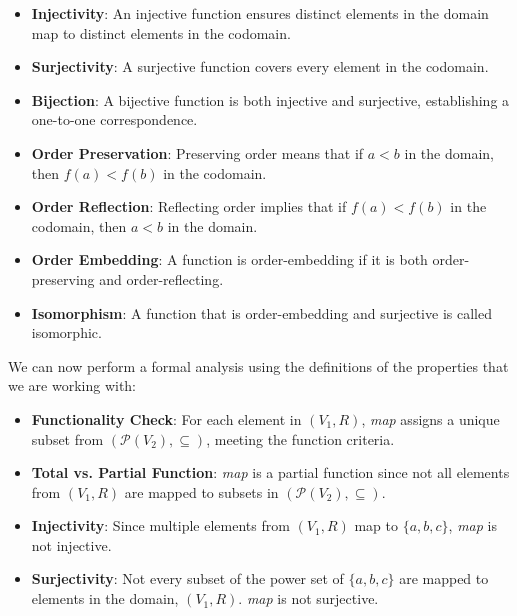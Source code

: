 \documentclass[12pt]{article}
\begin{document}
\begin{spacing}{1.5}
\begin{itemize}
		\item \textbf{Injectivity}: An injective function ensures distinct elements in the domain map to distinct elements in the codomain.
		      		          
		\item \textbf{Surjectivity}: A surjective function covers every element in the codomain.
		      		          
		\item \textbf{Bijection}: A bijective function is both injective and surjective, establishing a one-to-one correspondence.
		      		          
		\item \textbf{Order Preservation}: Preserving order means that if $a < b$ in the domain, then $f(a) < f(b)$ in the codomain.
		      		          
		\item \textbf{Order Reflection}: Reflecting order implies that if $f(a) < f(b)$ in the codomain, then $a < b$ in the domain.
		      		          
		\item \textbf{Order Embedding}: A function is order-embedding if it is both order-preserving and order-reflecting.
		      		          
		\item \textbf{Isomorphism}: A function that is order-embedding and surjective is called isomorphic. 
	\end{itemize}
		
	\noindent We can now perform a formal analysis using the definitions of the properties that we are working with:
		
	\begin{itemize}
		\item \textbf{Functionality Check}: For each element in $(V_1, R)$, \textit{map} assigns a unique subset from $(\mathcal{P}(V_2), \subseteq)$, meeting the function criteria.
		      		      
		\item \textbf{Total vs. Partial Function}: \textit{map} is a partial function since not all elements from $(V_1, R)$ are mapped to subsets in $(\mathcal{P}(V_2), \subseteq)$.
		      		      
		\item \textbf{Injectivity}: Since multiple elements from $(V_1, R)$ map to $\{a,b,c\}$, \textit{map} is not injective.
		      		      
		\item \textbf{Surjectivity}: Not every subset of the power set of $\{a,b,c\}$ are mapped to elements in the domain, $(V_1,R)$. \textit{map} is not surjective.
		      		      

\end{itemize}
\end{spacing}
\end{document}
